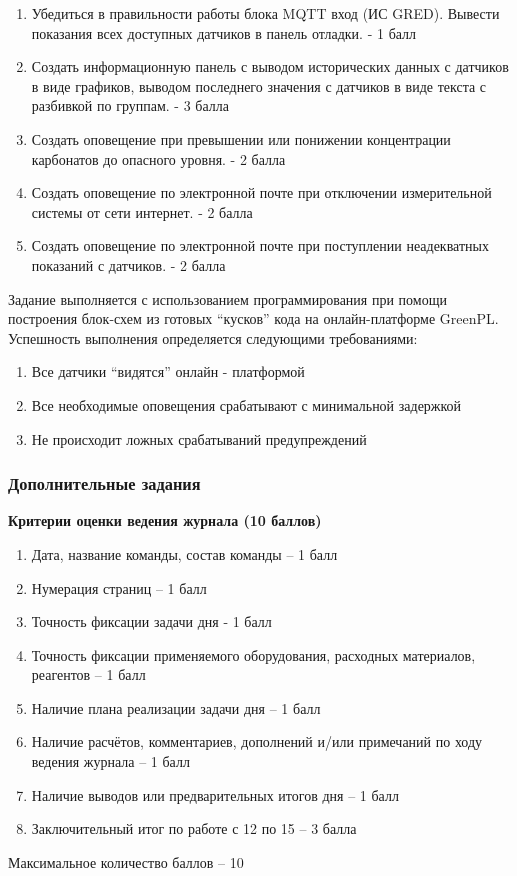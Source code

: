 
\begin{enumerate}
    \item  Убедиться в правильности работы блока MQTT вход (ИС GRED). Вывести показания всех доступных датчиков в панель отладки. - 1 балл
    \item Создать информационную панель с выводом исторических данных с датчиков в виде графиков, выводом последнего значения с датчиков в виде текста с разбивкой по группам. - 3 балла
    \item Создать оповещение при превышении или понижении концентрации карбонатов до опасного уровня. - 2 балла
    \item Создать оповещение по электронной почте при отключении измерительной системы от сети интернет. - 2 балла
    \item Создать оповещение по электронной почте при поступлении неадекватных показаний с датчиков. - 2 балла
    
\end{enumerate}

\markSection

Задание выполняется с использованием  программирования при помощи построения блок-схем из готовых “кусков” кода на онлайн-платформе GreenPL. 
Успешность выполнения определяется следующими требованиями:
\begin{enumerate}
    \item Все датчики “видятся” онлайн - платформой
    \item Все необходимые оповещения срабатывают с минимальной задержкой
    \item Не происходит ложных срабатываний предупреждений
\end{enumerate}

\subsubsection*{Дополнительные задания}

\textbf{Критерии оценки ведения журнала (10 баллов)}

\begin{enumerate}
    \item	Дата, название команды, состав команды – 1 балл
    \item	Нумерация страниц – 1 балл
    \item	Точность фиксации задачи дня -  1 балл
    \item	Точность фиксации применяемого оборудования, расходных материалов, реагентов – 1 балл
    \item	Наличие плана реализации задачи дня – 1 балл
    \item	Наличие расчётов, комментариев, дополнений и/или примечаний по ходу ведения журнала – 1 балл
    \item	Наличие выводов или предварительных итогов дня – 1 балл
    \item	Заключительный итог по работе с 12 по 15 – 3 балла
\end{enumerate}
    Максимальное количество баллов – 10


